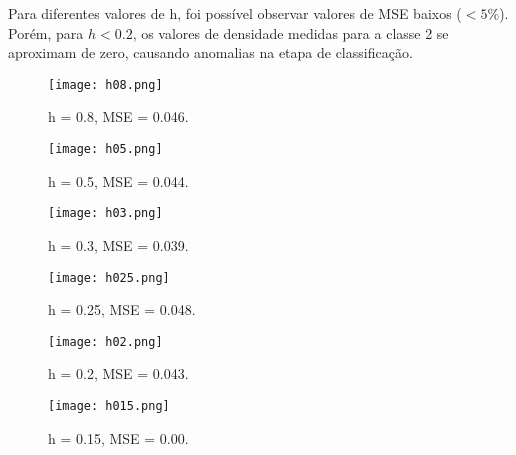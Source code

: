 \documentclass{article}
\begin{document}
Para diferentes valores de h, foi possível observar valores de MSE baixos ($< 5\%$). Porém, para $h < 0.2$, os valores de densidade medidas para a classe 2 se aproximam de zero, causando anomalias na etapa de classificação.

\begin{figure}
  \texttt{[image: h08.png]}
  \caption{h = 0.8, MSE = 0.046.}
  \label{fig:h08}
\end{figure}

\begin{figure}
  \texttt{[image: h05.png]}
  \caption{h = 0.5, MSE = 0.044.}
  \label{fig:h05}
\end{figure}

\begin{figure}
  \texttt{[image: h03.png]}
  \caption{h = 0.3, MSE = 0.039.}
  \label{fig:h03}
\end{figure}

\begin{figure}
  \texttt{[image: h025.png]}
  \caption{h = 0.25, MSE = 0.048.}
  \label{fig:h025}
\end{figure}

\begin{figure}
  \texttt{[image: h02.png]}
  \caption{h = 0.2, MSE = 0.043.}
  \label{fig:h02}
\end{figure}

\begin{figure}
  \texttt{[image: h015.png]}
  \caption{h = 0.15, MSE = 0.00.}
  \label{fig:h015}
\end{figure}
\end{document}
